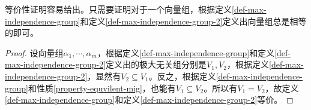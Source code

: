 等价性证明容易给出。只需要证明对于一个向量组，根据定义\ref{def-max-independence-group}和定义\ref{def-max-independence-group-2}定义出向量组总是相等的即可。

\begin{proof}
    设向量组$\alpha_1,\cdots,\alpha_m$，根据定义\ref{def-max-independence-group}和定义\ref{def-max-independence-group-2}定义出的极大无关组分别是$V_1,V_2$，根据定义\ref{def-max-independence-group-2}，显然有$V_2\subseteq V_1$。反之，根据定义\ref{def-max-independence-group}和性质\ref{property-equvilent-mig}，也能有$V_1\subseteq V_2$。所以有$V_1=V_2$，故定义\ref{def-max-independence-group}和定义\ref{def-max-independence-group-2}等价。
\end{proof}